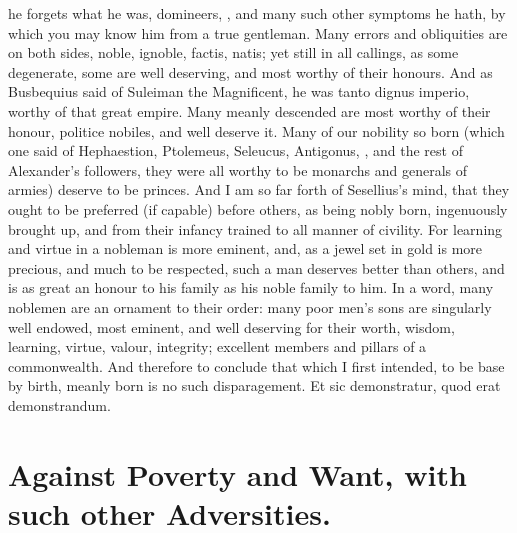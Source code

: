 {he forgets what he was, domineers, \etc{}, and many such other symptoms he
hath, by which you may know him from a true gentleman. Many errors and
obliquities are on both sides, noble, ignoble, factis, natis; yet still
in all callings, as some degenerate, some are well deserving, and most
worthy of their honours. And as Busbequius said of Suleiman the
Magnificent, he was tanto dignus imperio, worthy of that great empire.
Many meanly descended are most worthy of their honour, politice
nobiles, and well deserve it. Many of our nobility so born (which one
said of Hephaestion, Ptolemeus, Seleucus, Antigonus, \etc{}, and the rest
of Alexander's followers, they were all worthy to be monarchs and
generals of armies) deserve to be princes. And I am so far forth of
Sesellius's mind, that they ought to be preferred (if capable)
before others, as being nobly born, ingenuously brought up, and from
their infancy trained to all manner of civility. For learning and
virtue in a nobleman is more eminent, and, as a jewel set in gold is
more precious, and much to be respected, such a man deserves better
than others, and is as great an honour to his family as his noble
family to him. In a word, many noblemen are an ornament to their order:
many poor men's sons are singularly well endowed, most eminent, and
well deserving for their worth, wisdom, learning, virtue, valour,
integrity; excellent members and pillars of a commonwealth. And
therefore to conclude that which I first intended, to be base by birth,
meanly born is no such disparagement. Et sic demonstratur, quod erat
demonstrandum.


\section{Against Poverty and Want, with such other Adversities.}

}
